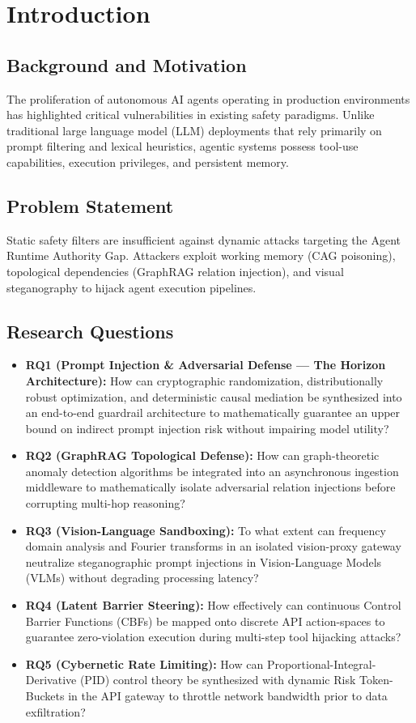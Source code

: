 \chapter{Introduction}
\label{ch:introduction}

\section{Background and Motivation}
The proliferation of autonomous AI agents operating in production environments has highlighted critical vulnerabilities in existing safety paradigms. Unlike traditional large language model (LLM) deployments that rely primarily on prompt filtering and lexical heuristics, agentic systems possess tool-use capabilities, execution privileges, and persistent memory.

\section{Problem Statement}
Static safety filters are insufficient against dynamic attacks targeting the Agent Runtime Authority Gap. Attackers exploit working memory (CAG poisoning), topological dependencies (GraphRAG relation injection), and visual steganography to hijack agent execution pipelines.

\section{Research Questions}
\begin{itemize}
    \item \textbf{RQ1 (Prompt Injection \& Adversarial Defense --- The Horizon Architecture):} How can cryptographic randomization, distributionally robust optimization, and deterministic causal mediation be synthesized into an end-to-end guardrail architecture to mathematically guarantee an upper bound on indirect prompt injection risk without impairing model utility?
    \item \textbf{RQ2 (GraphRAG Topological Defense):} How can graph-theoretic anomaly detection algorithms be integrated into an asynchronous ingestion middleware to mathematically isolate adversarial relation injections before corrupting multi-hop reasoning?
    \item \textbf{RQ3 (Vision-Language Sandboxing):} To what extent can frequency domain analysis and Fourier transforms in an isolated vision-proxy gateway neutralize steganographic prompt injections in Vision-Language Models (VLMs) without degrading processing latency?
    \item \textbf{RQ4 (Latent Barrier Steering):} How effectively can continuous Control Barrier Functions (CBFs) be mapped onto discrete API action-spaces to guarantee zero-violation execution during multi-step tool hijacking attacks?
    \item \textbf{RQ5 (Cybernetic Rate Limiting):} How can Proportional-Integral-Derivative (PID) control theory be synthesized with dynamic Risk Token-Buckets in the API gateway to throttle network bandwidth prior to data exfiltration?
\end{itemize}

